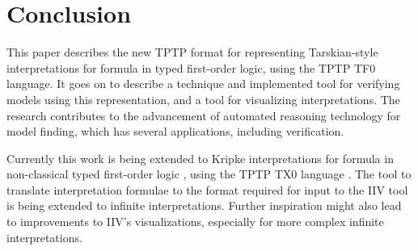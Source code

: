 \documentclass[letterpaper]{article}
\begin{document}
\section{Conclusion}
\label{Conclusion}

This paper describes the new TPTP format for representing Tarskian-style interpretations for
formula in typed first-order logic, using the TPTP TF0 language.
It goes on to describe a technique and implemented tool for verifying models using this 
representation, and a tool for visualizing interpretations.
The research contributes to the advancement of automated reasoning technology for model finding, 
which has several applications, including verification.

Currently this work is being extended to Kripke interpretations for formula in non-classical 
typed first-order logic \cite{SF+22}, using the TPTP TX0 language \cite{Sut22-IGPL}.
The tool to translate interpretation formulae to the format required for input to the IIV tool is 
being extended to infinite interpretations.
Further inspiration might also lead to improvements to IIV's visualizations, especially for more
complex infinite interpretations.



\end{document}
